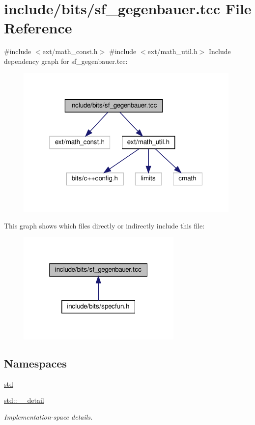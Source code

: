 \hypertarget{sf__gegenbauer_8tcc}{}\section{include/bits/sf\+\_\+gegenbauer.tcc File Reference}
\label{sf__gegenbauer_8tcc}
{\ttfamily \#include $<$ext/math\+\_\+const.\+h$>$}\newline
{\ttfamily \#include $<$ext/math\+\_\+util.\+h$>$}\newline
Include dependency graph for sf\+\_\+gegenbauer.\+tcc\+:
\nopagebreak
\begin{figure}[H]
\begin{center}
\leavevmode
\includegraphics[width=313pt]{sf__gegenbauer_8tcc__incl}
\end{center}
\end{figure}
This graph shows which files directly or indirectly include this file\+:
\nopagebreak
\begin{figure}[H]
\begin{center}
\leavevmode
\includegraphics[width=229pt]{sf__gegenbauer_8tcc__dep__incl}
\end{center}
\end{figure}
\subsection*{Namespaces}
\begin{DoxyCompactItemize}
\item 
 \hyperlink{namespacestd}{std}
\item 
 \hyperlink{namespacestd_1_1____detail}{std\+::\+\_\+\+\_\+detail}
\begin{DoxyCompactList}\small\item\em Implementation-\/space details. \end{DoxyCompactList}\end{DoxyCompactItemize}
